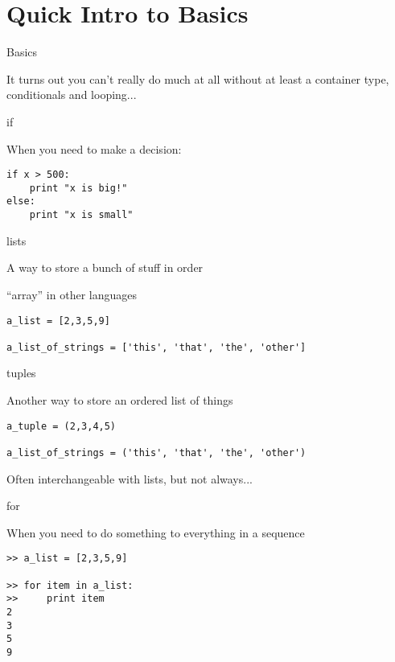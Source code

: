 \documentclass{beamer}
\begin{document}
\section{Quick Intro to Basics}

\begin{frame}[fragile]{Basics}

\vfill
{\Large It turns out you can't really do much at all without at least a container type, conditionals and looping...}
\vfill

\end{frame}

\begin{frame}[fragile]{if}

{\Large When you need to make a decision:}

\begin{verbatim}
if x > 500:
    print "x is big!"
else:
    print "x is small"
\end{verbatim}

\end{frame}


\begin{frame}[fragile]{lists}

\vfill
{\Large A way to store a bunch of stuff in order}

\vfill
{\large ``array'' in other languages}

\vfill
\begin{verbatim}
a_list = [2,3,5,9]

a_list_of_strings = ['this', 'that', 'the', 'other']
\end{verbatim}

\vfill

\end{frame}

\begin{frame}[fragile]{tuples}

\vfill
{\Large Another way to store an ordered list of things}

\vfill
\begin{verbatim}
a_tuple = (2,3,4,5)

a_list_of_strings = ('this', 'that', 'the', 'other')
\end{verbatim}

\vfill
{\Large Often interchangeable with lists, but not always...}

\end{frame}


\begin{frame}[fragile]{for}

{\Large When you need to do something to everything in a sequence}

\vfill
\begin{verbatim}
>> a_list = [2,3,5,9]

>> for item in a_list:
>>     print item
2
3
5
9
\end{verbatim}

\end{frame}
\end{document}
